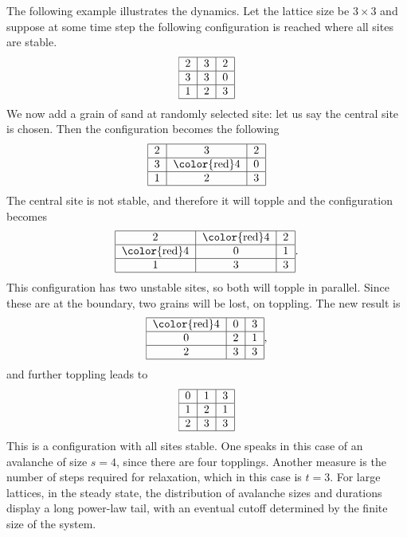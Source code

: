\documentclass[11pt,a4paper]{book}
\begin{document}
The following example illustrates the dynamics. Let the lattice size
be $3\times 3$ and suppose at some time step the following
configuration is reached where all sites are stable.
$$
\begin{tabular}{|c|c|c|}
\hline
2 & 3 & 2 \\
\hline
3 & 3 & 0 \\
\hline
1 & 2 & 3 \\
\hline
\end{tabular}
$$
We now add a grain of sand at randomly selected site: let us say the
central site is chosen. Then the configuration becomes the
following
$$
\begin{tabular}{|c|c|c|}
\hline
2 & 3 & 2 \\
\hline
3 & {\color{red}4} & 0 \\
\hline
1 & 2 & 3 \\
\hline
\end{tabular}
$$
The central site is not stable, and therefore it will topple and
the configuration becomes
$$
\begin{tabular}{|c|c|c|}
\hline
2 & {\color{red}4} & 2 \\
\hline
 {\color{red}4} & 0 & 1 \\
\hline
1 & 3 & 3 \\
\hline
\end{tabular}.
$$
This configuration has two unstable sites, so both
will topple in parallel. Since these are at the boundary, two grains
will be lost, on toppling. The new result is
$$
\begin{tabular}{|c|c|c|}
\hline
{\color{red}4}  & 0 & 3 \\
\hline
0 & 2 & 1 \\
\hline
2 & 3 & 3 \\
\hline
\end{tabular},
$$
and further toppling leads to
$$
\begin{tabular}{|c|c|c|}
\hline
0 & 1 & 3 \\
\hline
1 & 2 & 1 \\
\hline
2 & 3 & 3 \\
\hline
\end{tabular}
$$
This is a configuration with all sites stable. One speaks in this case
of an avalanche of size $s=4$, since there are four topplings. Another
measure is the number of steps required for relaxation, which in this case
is $t=3$.
For large lattices, in the steady state, the distribution of avalanche sizes and durations
display a long power-law tail, with an eventual cutoff determined by
the finite size of the system.
\end{document}
